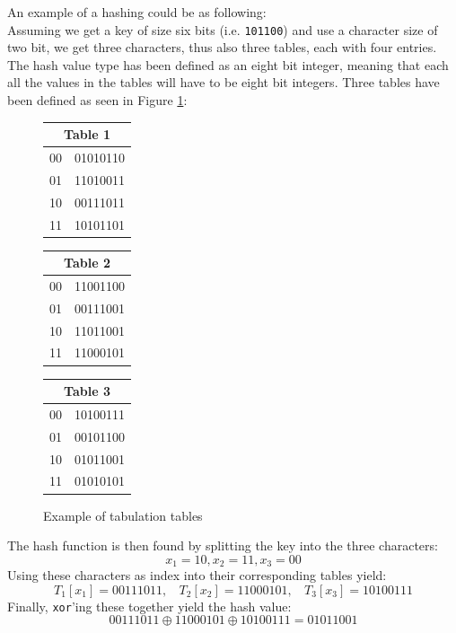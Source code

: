 \documentclass[11pt]{article} %
\begin{document}
An example of a hashing could be as following:\\ Assuming we get a key of size six bits (i.e. \verb|101100|) and use a character size of two bit, we get three characters, thus also three tables, each with four entries. The hash value type has been defined as an eight bit integer, meaning that each all the values in the tables will have to be eight bit integers. Three tables have been defined as seen in Figure \ref{fig:tabulation_tables}:\\
\begin{figure}
  \quad\quad\quad\quad\quad
  \begin{tabular}{|c|c|}
  \hline
  \multicolumn{2}{|c|}{Table 1}\\
  \hline
  00&01010110\\
  01&11010011\\
  10&00111011\\
  11&10101101\\
  \hline
  \end{tabular}
  \quad\quad\quad\quad
  \begin{tabular}{|c|c|}
  \hline
  \multicolumn{2}{|c|}{Table 2}\\
  \hline
  00&11001100\\
  01&00111001\\
  10&11011001\\
  11&11000101\\
  \hline
  \end{tabular}
  \quad\quad\quad\quad
  \begin{tabular}{|c|c|}
  \hline
  \multicolumn{2}{|c|}{Table 3}\\
  \hline
  00&10100111\\
  01&00101100\\
  10&01011001\\
  11&01010101\\
  \hline
  \end{tabular}
  \caption{Example of tabulation tables}
  \label{fig:tabulation_tables} 
\end{figure}
The hash function is then found by splitting the key into the three characters: $$x_1 = 10, x_2 = 11, x_3 = 00$$ Using these characters as index into their corresponding tables yield: $$T_1[x_1] = 00111011,\ \ \ \ T_2[x_2] = 11000101,\ \ \ \ T_3[x_3] = 10100111$$ Finally, \verb|xor|'ing these together yield the hash value: $$00111011 \oplus 11000101 \oplus 10100111 = 01011001$$
\end{document}
